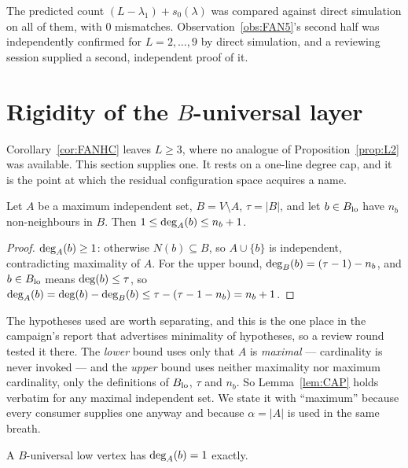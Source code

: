 \begin{remark}\label{rem:TAILnum}
The predicted count $(L-\lambda_1)+s_0(\lambda)$ was compared against direct simulation on
all of them, with $0$ mismatches. Observation~\ref{obs:FAN5}'s second half was
independently confirmed for $L = 2,\dots,9$ by direct simulation, and a reviewing session
supplied a second, independent proof of it.
\end{remark}

\section{Rigidity of the \texorpdfstring{$B$}{B}-universal layer}\label{sec:rig}

Corollary~\ref{cor:FANHC} leaves $L \ge 3$, where no analogue of
Proposition~\ref{prop:L2} was available. This section supplies one. It rests on a
one-line degree cap, and it is the point at which the residual configuration space acquires
a name.

\begin{lemma}\label{lem:CAP}
Let $A$ be a maximum independent set, $B = V \setminus A$, $\tau = |B|$, and let
$b \in B_{\mathrm{lo}}$ have $n_b$ non-neighbours in $B$. Then $1 \le \mathrm{deg}_A(b) \le n_b + 1$.
\end{lemma}

\begin{proof}
$\mathrm{deg}_A(b) \ge 1$: otherwise $N(b) \subseteq B$, so $A \cup \{b\}$ is independent,
contradicting maximality of $A$. For the upper bound, $\mathrm{deg}_B(b) = (\tau-1) - n_b$, and
$b \in B_{\mathrm{lo}}$ means $\mathrm{deg}(b) \le \tau$, so
$\mathrm{deg}_A(b) = \mathrm{deg}(b) - \mathrm{deg}_B(b) \le \tau - (\tau-1-n_b) = n_b+1$.
\end{proof}

The hypotheses used are worth separating, and this is the one place in the campaign's
report that advertises minimality of hypotheses, so a review round tested it there. The
\emph{lower} bound uses only that $A$ is \emph{maximal} --- cardinality is never invoked ---
and the \emph{upper} bound uses neither maximality nor maximum cardinality, only the
definitions of $B_{\mathrm{lo}}$, $\tau$ and $n_b$. So Lemma~\ref{lem:CAP} holds verbatim for any
maximal independent set. We state it with ``maximum'' because every consumer supplies one
anyway and because $\alpha = |A|$ is used in the same breath.

\begin{corollary}\label{cor:CAP1}
A $B$-universal low vertex has $\mathrm{deg}_A(b) = 1$ exactly.
\end{corollary}

